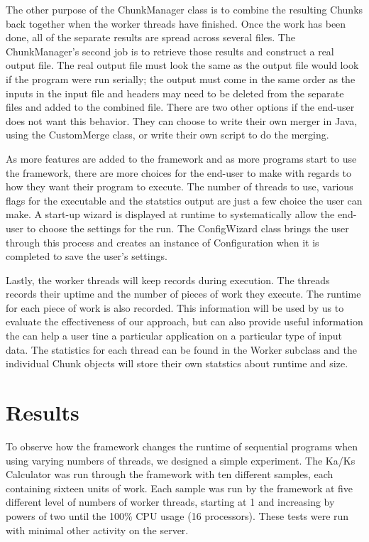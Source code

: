 \documentclass[12pt]{article}
\begin{document}
The other purpose of the ChunkManager class is to combine the resulting Chunks 
back together when the worker threads have finished. Once the work has been
done, all of the separate results are spread across several files. The
ChunkManager's second job is to retrieve those results and construct a real
output file. The real output file must look the same as the output file would
look if the program were run serially; the output must come in the same order as
the inputs in the input file and headers may need to be deleted from the
separate files and added to the combined file. There are two other options if
the end-user does not want this behavior. They can choose to write their own
merger in Java, using the CustomMerge class, or write their own script to do the
merging. 

As more features are added to the framework and as more programs start to use 
the framework, there are more choices for the end-user to make with regards to 
how they want their program to execute. The number of threads to use, various 
flags for the executable and the statstics output are just a few choice the 
user can make. A start-up wizard is displayed at runtime to systematically allow
the end-user to choose the settings for the run. The ConfigWizard class brings 
the user through this process and creates an instance of Configuration when it 
is completed to save the user's settings.

Lastly, the worker threads will keep records during execution. The threads 
records their uptime and the number of pieces of work they execute. The runtime 
for each piece of work is also recorded. This information will be used by us to
evaluate the effectiveness of our approach, but can also provide useful
information the can help a user tine a particular application on a particular
type of input data. The statistics for each thread can be found in the Worker 
subclass and the individual Chunk objects will store their own statstics about 
runtime and size.

\section{Results}

To observe how the framework changes the runtime of sequential programs when
using varying numbers of threads, we designed a simple experiment. The Ka/Ks 
Calculator was run through the framework with ten different samples, each 
containing sixteen units of work. Each sample was run by the framework at five 
different level of numbers of worker threads, starting at 1 and increasing by 
powers of two until the 100\% CPU usage (16 processors). These tests were run
with minimal other activity on the server.
\end{document}
